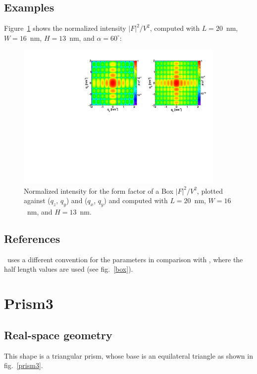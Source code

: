 \subsection{Examples}
Figure~\ref{figFFBoxEx} shows the normalized intensity
$|F|^2/V^2$, computed with $L=20$~nm, $W=16$~nm, $H=13$~nm, and
$\alpha=60^{\circ}$:

\begin{figure}[h]
\begin{center}
\includegraphics[width=0.9\textwidth]{Figures/figffbox}
\end{center}
\caption{Normalized intensity for the form factor of a Box
  $|F|^2/V^2$, plotted against ($q_z$, $q_y$) and  ($q_x$, $q_y$) and computed with $L=20$~nm, $W=16$~nm, and $H=13$~nm.}
\label{figFFBoxEx}
\end{figure}

\FloatBarrier

\subsection{References}
\BornAgain\ uses a different convention for the parameters in comparison with , where the half length
values are used (see fig.~\ref{box}).

\newpage{\cleardoublepage}
\section{Prism3} 
 
\subsection{Real-space geometry}
This shape is a triangular prism, whose base is an equilateral
triangle as shown in fig.~\ref{prism3}.

